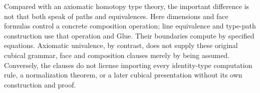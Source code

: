 Compared with an axiomatic homotopy type theory, the important
difference is not that both speak of paths and equivalences.  Here
dimensions and face formulas control a concrete composition operation;
line equivalence and type-path construction use that operation and
Glue.  Their boundaries compute by specified equations.  Axiomatic
univalence, by contrast, does not supply these original cubical
grammar, face and composition clauses merely by being assumed.
Conversely, the clauses do not license importing every identity-type
computation rule, a normalization theorem, or a later cubical
presentation without its own construction and proof.
